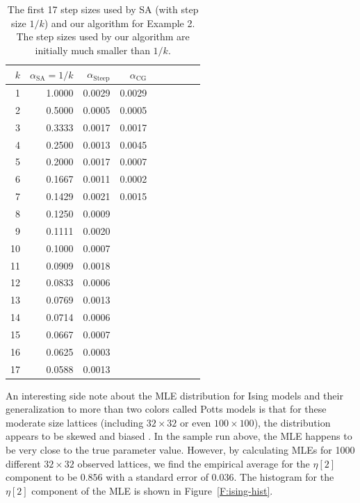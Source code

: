 \begin{table}
\caption[Comparisons of step sizes for SA and our algorithm for Example 2]{The first 17 step sizes used by SA (with step size $1/k$) and our algorithm 
for Example 2.  The step sizes 
used by our algorithm are initially much smaller than $1/k$.}
\begin{center}
\begin{tabular}{rrrrrrrrr}
  \hline
  $k$ & $\alpha_{\textrm{SA}} =1/k$  & $\alpha_{\textrm{Steep}}$ & $\alpha_{\textrm
{CG}}$ \\ 
  \hline
1	&	1.0000	&	0.0029	&	0.0029	\\
2	&	0.5000	&	0.0005	&	0.0005	\\
3	&	0.3333	&	0.0017	&	0.0017	\\
4	&	0.2500	&	0.0013	&	0.0045	\\
5	&	0.2000	&	0.0017	&	0.0007	\\
6	&	0.1667	&	0.0011	&	0.0002	\\
7	&	0.1429	&	0.0021	&	0.0015	\\
8	&	0.1250	&	0.0009	&		\\
9	&	0.1111	&	0.0020	&		\\
10	&	0.1000	&	0.0007	&		\\
11	&	0.0909	&	0.0018	&		\\
12	&	0.0833	&	0.0006	&		\\
13	&	0.0769	&	0.0013	&		\\
14	&	0.0714	&	0.0006	&		\\
15	&	0.0667	&	0.0007	&		\\
16	&	0.0625	&	0.0003	&		\\
17	&	0.0588	&	0.0013	&		\\
  \hline
\end{tabular}
\end{center}
\label{Table:Potts step size}
\end{table}

An interesting side note about the MLE distribution for Ising models
and their generalization to 
more than two colors called Potts models is that for these moderate size lattices (including
$32 \times 32$ or even $100 \times 100$), the distribution appears to be skewed and 
biased \citep{Composite}.  In the sample run above, the MLE happens to be very close 
to the true parameter value.  However, by calculating MLEs for 1000 different $32 \times 32$
observed lattices, we find the empirical average for the $\eta[2]$ component to be $0.856$ with a
standard error of 0.036.  The histogram for the $\eta[2]$ component of the MLE 
is shown in Figure~\ref{F:ising-hist}. 

